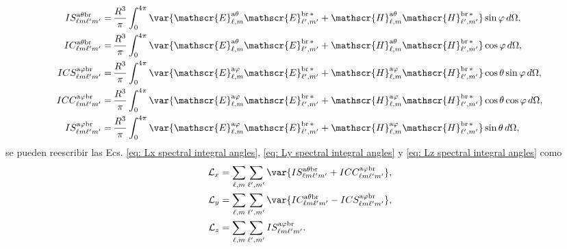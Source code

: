 \begin{align}
IS_{\ell m \ell^{\prime} m^{\prime}}^{\rm a \theta b r} 
=& \, \frac{R^3}{\pi} \int_{0}^{4\pi} \var{\mathscr{E}_{\ell, m}^{\text{a}\theta}\mathscr{E}_{\ell^{\prime}, m^{\prime}}^{\text{br}\,*} + \mathscr{H}_{\ell, m}^{\text{a}\theta}\mathscr{H}_{\ell^{\prime}, m^{\prime}}^{\text{br}\,*} } \sin\varphi \, d\Omega ,
\\
%
%
%
IC_{\ell m \ell^{\prime} m^{\prime}}^{\rm a \theta b r} 
=& \, \frac{R^3}{\pi} \int_{0}^{4\pi} \var{\mathscr{E}_{\ell, m}^{\text{a}\theta}\mathscr{E}_{\ell^{\prime}, m^{\prime}}^{\text{br}\,*} + \mathscr{H}_{\ell, m}^{\text{a}\theta}\mathscr{H}_{\ell^{\prime}, m^{\prime}}^{\text{br}\,*} } \cos\varphi \, d\Omega,
\\
%
%
%
ICS_{\ell m \ell^{\prime} m^{\prime}}^{\rm a \varphi b r}
=& \, \frac{R^3}{\pi} \int_0^{4\pi} \var{\mathscr{E}_{\ell, m}^{\text{a}\varphi}\mathscr{E}_{\ell^{\prime}, m^{\prime}}^{\text{br}\,*} + \mathscr{H}_{\ell, m}^{\text{a}\varphi}\mathscr{H}_{\ell^{\prime}, m^{\prime}}^{\text{br}\,*}}\cos\theta\sin\varphi \, d\Omega,  \\
%
%
%
ICC_{\ell m \ell^{\prime} m^{\prime}}^{\rm a \varphi b r}
 =& \, \frac{R^3}{\pi} \int_0^{4\pi}\var{\mathscr{E}_{\ell, m}^{\text{a}\varphi}\mathscr{E}_{\ell^{\prime}, m^{\prime}}^{\text{br}\,*} + \mathscr{H}_{\ell, m}^{\text{a}\varphi}\mathscr{H}_{\ell^{\prime}, m^{\prime}}^{\text{br}\,*}}\cos\theta\cos\varphi \, d\Omega, \\
%
%
%
IS_{\ell m \ell^{\prime} m^{\prime}}^{\rm a \varphi b r}
 =& \, \frac{R^3}{\pi} \int_0^{4\pi}\var{\mathscr{E}_{\ell, m}^{\text{a}\varphi}\mathscr{E}_{\ell^{\prime}, m^{\prime}}^{\text{br}\,*} + \mathscr{H}_{\ell, m}^{\text{a}\varphi}\mathscr{H}_{\ell^{\prime}, m^{\prime}}^{\text{br}\,*}}\sin\theta \, d\Omega ,
\end{align}
se pueden reescribir las Ecs. \eqref{eq: Lx spectral integral angles}, \eqref{eq: Ly spectral integral angles} y \eqref{eq: Lz spectral integral angles} como 
%
\begin{align}
\mathcal{L}_x &= 
\sum_{\ell, m} \sum_{\ell^{\prime}, m^{\prime}} 
\var{IS_{\ell m \ell^{\prime} m^{\prime}}^{\rm a \theta b r} + 
ICC_{\ell m \ell^{\prime} m^{\prime}}^{\rm a \varphi b r}}, \label{eq: Lx spectral integral angles solved}\\
% 
\mathcal{L}_y &= 
\sum_{\ell, m} \sum_{\ell^{\prime}, m^{\prime}}
\var{IC_{\ell m \ell^{\prime} m^{\prime}}^{\rm a \theta b r} - 
ICS_{\ell m \ell^{\prime} m^{\prime}}^{\rm a \varphi b r}}, \label{eq: Ly spectral integral angles solved}\\ 
%
\mathcal{L}_z &= 
\sum_{\ell, m} \sum_{\ell^{\prime}, m^{\prime}}
IS_{\ell m \ell^{\prime} m^{\prime}}^{\rm a \varphi b r}. \label{eq: Lz spectral integral angles solved}
\end{align}
%